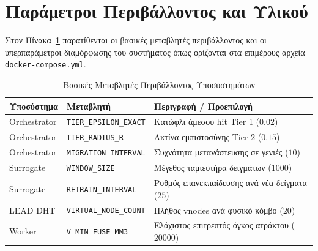 \section{Παράμετροι Περιβάλλοντος και Υλικού}
\label{sec:hardware_specs}

Στον Πίνακα~\ref{tab:env_params} παρατίθενται οι βασικές μεταβλητές περιβάλλοντος και οι υπερπαράμετροι διαμόρφωσης του συστήματος όπως ορίζονται στα επιμέρους αρχεία \texttt{docker-compose.yml}.

\begin{table}[H]
\centering
\caption{Βασικές Μεταβλητές Περιβάλλοντος Υποσυστημάτων}
\label{tab:env_params}
\begin{tabularx}{\textwidth}{llX}
\toprule
\textbf{Υποσύστημα} & \textbf{Μεταβλητή} & \textbf{Περιγραφή / Προεπιλογή} \\
\midrule
Orchestrator & \texttt{TIER\_EPSILON\_EXACT} & Κατώφλι άμεσου hit Tier 1 ($0.02$) \\
Orchestrator & \texttt{TIER\_RADIUS\_R}      & Ακτίνα εμπιστοσύνης Tier 2 ($0.15$) \\
Orchestrator & \texttt{MIGRATION\_INTERVAL}  & Συχνότητα μετανάστευσης σε γενιές ($10$) \\
Surrogate    & \texttt{WINDOW\_SIZE}         & Μέγεθος ταμιευτήρα δειγμάτων ($1000$) \\
Surrogate    & \texttt{RETRAIN\_INTERVAL}    & Ρυθμός επανεκπαίδευσης ανά νέα δείγματα ($25$) \\
LEAD DHT     & \texttt{VIRTUAL\_NODE\_COUNT} & Πλήθος vnodes ανά φυσικό κόμβο ($20$) \\
Worker       & \texttt{V\_MIN\_FUSE\_MM3}    & Ελάχιστος επιτρεπτός όγκος ατράκτου ($20000$) \\
\bottomrule
\end{tabularx}
\end{table}
